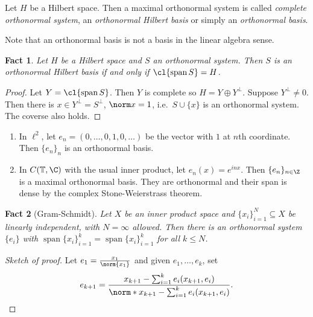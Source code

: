 \documentclass[a4paper]{article}
\newtheorem*{fact}{Fact}
\DeclareMathOperator{\spans}{span} %
\begin{document}
\begin{definition}
  Let \(H\) be a Hilbert space. Then a maximal orthonormal system is called \emph{complete orthonormal system}, an \emph{orthonormal Hilbert basis} or simply an \emph{orthonormal basis}.
\end{definition}

Note that an orthonormal basis is not a basis in the linear algebra sense.

\begin{fact}
  Let \(H\) be a Hilbert space and \(S\) an orthonormal system. Then \(S\) is an orthonormal Hilbert basis if and only if \(\cl{\spans S} = H\).
\end{fact}

\begin{proof}
  Let \(Y = \cl{\spans S}\). Then \(Y\) is complete so \(H = Y \oplus Y^\perp\). Suppose \(Y^\perp \neq 0\). Then there is \(x \in Y^\perp = S^\perp\), \(\norm x = 1\), i.e.\ \(S \cup \{x\}\) is an orthonormal system. The coverse also holds.
\end{proof}

\begin{eg}\leavevmode
  \begin{enumerate}
  \item In \(\ell^2\), let \(e_n = (0, \dots, 0, 1, 0, \dots)\) be the vector with \(1\) at \(n\)th coordinate. Then \(\{e_n\}_n\) is an orthonormal basis.
  \item In \(C(\mathbb T, \C)\) with the usual inner product, let \(e_n(x) = e^{inx}\). Then \(\{e_n\}_{n \in \Z}\) is a maximal orthonormal basis. They are orthonormal and their span is dense by the complex Stone-Weierstrass theorem.
  \end{enumerate}
\end{eg}

\begin{fact}[Gram-Schmidt]
  Let \(X\) be an inner product space and \(\{x_i\}_{i = 1}^N \subseteq X\) be linearly independent, with \(N = \infty\) allowed. Then there is an orthonormal system \(\{e_i\}\) with \(\spans \{x_i\}_{i = 1}^k = \spans \{x_i\}_{i = 1}^k\) for all \(k \leq N\).
\end{fact}

\begin{proof}[Sketch of proof]
  Let \(e_1 = \frac{x_1}{\norm{x_1}}\) and given \(e_1, \dots, e_k\), set
  \[
    e_{k + 1} = \frac{x_{k + 1} - \sum_{i = 1}^k e_i(x_{k + 1}, e_i)}{\norm*{x_{k + 1} - \sum_{i = 1}^k e_i(x_{k + 1}, e_i)}}.
  \]
\end{proof}
\end{document}
